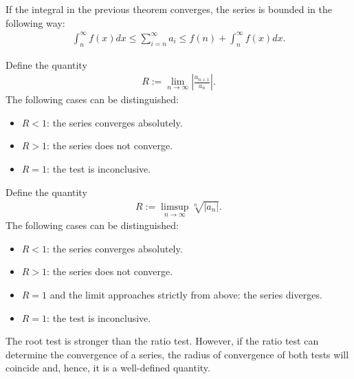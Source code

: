     \begin{property}
        If the integral in the previous theorem converges, the series is bounded in the following way:
        \begin{gather}
            \int_n^\infty f(x)dx\leq\sum_{i=n}^\infty a_i \leq f(n) + \int_n^\infty f(x)dx.
        \end{gather}
    \end{property}

    \begin{method}
        Define the quantity
        \begin{gather}
            R := \lim_{n\rightarrow\infty}\left|\frac{a_{n+1}}{a_n}\right|.
        \end{gather}
        The following cases can be distinguished:
        \begin{itemize}
            \item $R<1$: the series converges absolutely.
            \item $R>1$: the series does not converge.
            \item $R=1$: the test is inconclusive.
        \end{itemize}
    \end{method}

    \begin{method}
        Define the quantity
        \begin{gather}
            R := \limsup_{n\rightarrow\infty}\sqrt[n]{|a_n|}.
        \end{gather}
        The following cases can be distinguished:
        \begin{itemize}
            \item $R<1$: the series converges absolutely.
            \item $R>1$: the series does not converge.
            \item $R=1$ and the limit approaches strictly from above: the series diverges.
            \item $R=1$: the test is inconclusive.
        \end{itemize}
    \end{method}
    \begin{remark}
        The root test is stronger than the ratio test. However, if the ratio test can determine the convergence of a series, the radius of convergence of both tests will coincide and, hence, it is a well-defined quantity.
    \end{remark}

